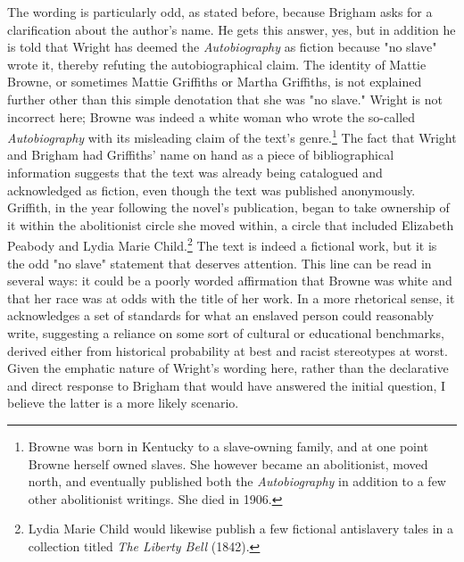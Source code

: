 The wording is particularly odd, as stated before, because Brigham asks for a clarification about the author's name. He gets this answer, yes, but in addition he is told that Wright has deemed the \textit{Autobiography} as fiction because "no slave" wrote it, thereby refuting the autobiographical claim. The identity of Mattie Browne, or sometimes Mattie Griffiths or Martha Griffiths, is not explained further other than this simple denotation that she was "no slave." Wright is not incorrect here; Browne was indeed a white woman who wrote the so-called \textit{Autobiography} with its misleading claim of the text's genre.\footnote{Browne was born in Kentucky to a slave-owning family, and at one point Browne herself owned slaves. She however became an abolitionist, moved north, and eventually published both the \textit{Autobiography} in addition to a few other abolitionist writings. She died in 1906.\autocite{browne_autobiography_1998}} The fact that Wright and Brigham had Griffiths' name on hand as a piece of bibliographical information suggests that the text was already being catalogued and acknowledged as fiction, even though the text was published anonymously. Griffith, in the year following the novel's publication, began to take ownership of it within the abolitionist circle she moved within, a circle that included Elizabeth Peabody and Lydia Marie Child.\footnote{Lydia Marie Child would likewise publish a few fictional antislavery tales in a collection titled \textit{The Liberty Bell} (1842).} \autocite[403-418]{browne_afterword_1998} The text is indeed a fictional work, but it is the odd "no slave" statement that deserves attention. This line can be read in several ways: it could be a poorly worded affirmation that Browne was white and that her race was at odds with the title of her work. In a more rhetorical sense, it acknowledges a set of standards for what an enslaved person could reasonably write, suggesting a reliance on some sort of cultural or educational benchmarks, derived either from historical probability at best and racist stereotypes at worst. Given the emphatic nature of Wright's wording here, rather than the declarative and direct response to Brigham that would have answered the initial question, I believe the latter is a more likely scenario.

